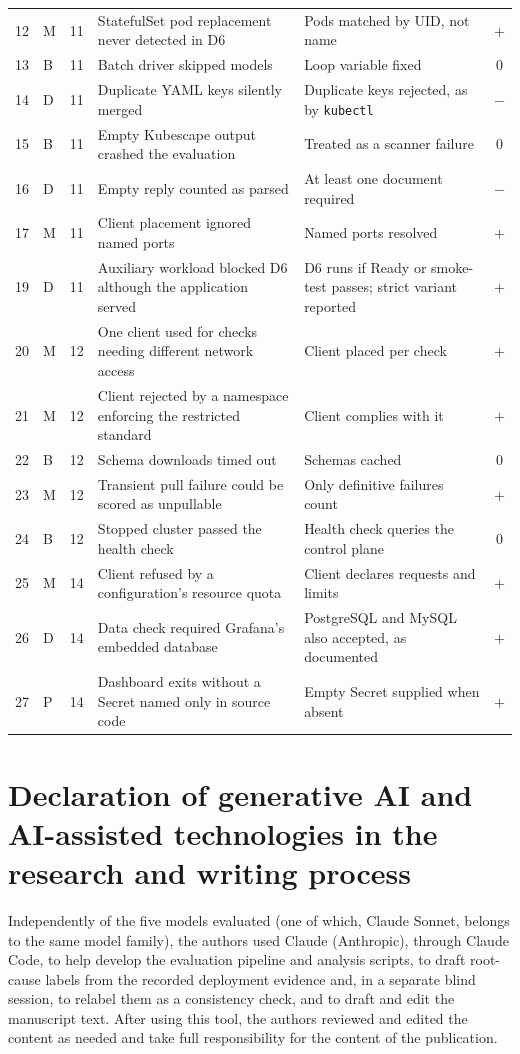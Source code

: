 \documentclass[a4paper,fleqn]{cas-dc}
\begin{document}
\begin{table}[t]
\begin{tabular}{rllp{}p{}c}
12 & M & 11 & StatefulSet pod replacement never detected in D6 & Pods matched by UID, not name & $+$ \\
13 & B & 11 & Batch driver skipped models & Loop variable fixed & 0 \\
14 & D & 11 & Duplicate YAML keys silently merged & Duplicate keys rejected, as by \texttt{kubectl} & $-$ \\
15 & B & 11 & Empty Kubescape output crashed the evaluation & Treated as a scanner failure & 0 \\
16 & D & 11 & Empty reply counted as parsed & At least one document required & $-$ \\
17 & M & 11 & Client placement ignored named ports & Named ports resolved & $+$ \\
19 & D & 11 & Auxiliary workload blocked D6 although the application served & D6 runs if Ready or smoke-test passes; strict variant reported & $+$ \\
20 & M & 12 & One client used for checks needing different network access & Client placed per check & $+$ \\
21 & M & 12 & Client rejected by a namespace enforcing the restricted standard & Client complies with it & $+$ \\
22 & B & 12 & Schema downloads timed out & Schemas cached & 0 \\
23 & M & 12 & Transient pull failure could be scored as unpullable & Only definitive failures count & $+$ \\
24 & B & 12 & Stopped cluster passed the health check & Health check queries the control plane & 0 \\
25 & M & 14 & Client refused by a configuration's resource quota & Client declares requests and limits & $+$ \\
26 & D & 14 & Data check required Grafana's embedded database & PostgreSQL and MySQL also accepted, as documented & $+$ \\
27 & P & 14 & Dashboard exits without a Secret named only in source code & Empty Secret supplied when absent & $+$ \\
\bottomrule
\end{tabular}
\end{table}



\FloatBarrier
\section*{Declaration of generative AI and AI-assisted technologies in the research and writing process}
Independently of the five models evaluated (one of which, Claude Sonnet, belongs to the same model family), the authors used Claude (Anthropic), through Claude Code, to help develop the evaluation pipeline and analysis scripts, to draft root-cause labels from the recorded deployment evidence and, in a separate blind session, to relabel them as a consistency check, and to draft and edit the manuscript text. After using this tool, the authors reviewed and edited the content as needed and take full responsibility for the content of the publication.
\end{document}
